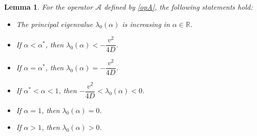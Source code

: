 \documentclass{mpi2015-cscpreprint}
\newtheorem{lemma}[theorem]{Lemma}
\numberwithin{equation}{section}
\begin{document}
\begin{lemma}\label{lem:dependelne_on_alpha}
For the operator $\mathcal{A}$ defined by \eqref{opA}, the following statements hold:
\begin{itemize}
    \item[$(i)$] The principal eigenvalue $\lambda_0(\alpha)$ is increasing in $\alpha\in\mathbb R$.

    \item[$(ii)$] If $\alpha < \alpha^*$, then $\lambda_0(\alpha)<-\dfrac{v^2}{4D}$.

    \item[$(iii)$] If $\alpha = \alpha^*$, then $\lambda_0(\alpha)=-\dfrac{v^2}{4D}$.

    \item[$(iv)$] If $\alpha^*<\alpha<1$, then $-\dfrac{v^2}{4D}<\lambda_0(\alpha)<0$.
    
    \item[$(v)$] If $\alpha = 1$, then $\lambda_0(\alpha)=0$.
    
    \item[$(vi)$] If $\alpha > 1$, then $\lambda_0(\alpha)>0$.
\end{itemize}
\end{lemma}
\end{document}

